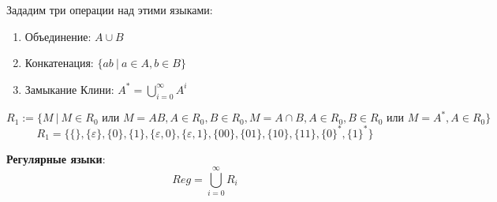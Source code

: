 Зададим три операции над этими языками:
\begin{enumerate}
    \item Объединение: $A\cup B$
    \item Конкатенация: $\{ab\ |\ a\in A, b\in B\}$
    \item Замыкание Клини: $A^*=\bigcup\limits_{i=0}^\infty A^i$
\end{enumerate}

$$R_1:=\{M \ | \ M\in R_0 \text{ или } M=AB, A\in R_0, B\in R_0, M=A\cap B, A\in R_0, B\in R_0 \text{ или } M=A^*, A\in R_0\}$$
$$R_1=\{\{\}, \{\varepsilon\}, \{0\}, \{1\}, \{\varepsilon, 0\}, \{\varepsilon, 1\}, \{00\}, \{01\}, \{10\}, \{11\}, \{0\}^*, \{1\}^* \}$$

\begin{definition}
    \textbf{Регулярные языки}:
    $$Reg=\bigcup_{i=0}^\infty R_i$$
\end{definition}

